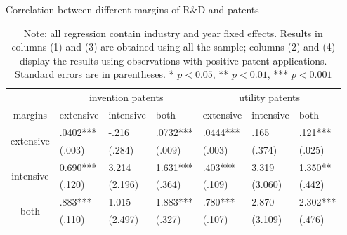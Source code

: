 \documentclass[11pt]{article}
\begin{document}
\begin{table}[h]
\centering
\caption{Correlation between different margins of R\&D and patents}
\label{T4}
\begin{tabular}{cllllll}
\toprule
 & \multicolumn{3}{c}{invention patents} & \multicolumn{3}{c}{utility patents} \\
 margins& extensive   & intensive  & both       & extensive  & intensive  & both      \\
                                          \hline 
\multirow{2}{*}{extensive} & .0402***   & -.216     & .0732***  & .0444***  & .165      & .121***  \\
                                          & (.003)     & (.284)    & (.009)    & (.003)    & (.374)    & (.025)   \\
                                          \hline
\multirow{2}{*}{intensive} & 0.690***    & 3.214      & 1.631***   & .403***   & 3.319      & 1.350**   \\
                                          & (.120)     & (2.196)    & (.364)    & (.109)    & (3.060)    & (.442)   \\
 \hline
\multirow{2}{*}{both}                     & .883***   & 1.015      & 1.883***   & .780***  & 2.870      & 2.302***  \\
                                          & (.110)     & (2.497)    & (.327)    & (.107)    & (3.109)    & (.476)  \\ \bottomrule
\end{tabular}
\caption*{\small{}Note: all regression contain industry and year fixed effects. Results in columns (1) and (3) are obtained using all the sample; columns (2) and (4) display the results using observations with positive patent applications. Standard errors are in parentheses. * \(p<0.05\), ** \(p<0.01\), *** \(p<0.001\)} {\small \par}
\end{table}
\end{document}
